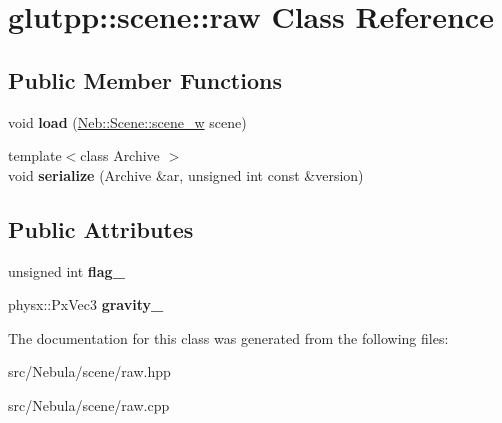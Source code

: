 \hypertarget{classglutpp_1_1scene_1_1raw}{\section{glutpp\-:\-:scene\-:\-:raw \-Class \-Reference}
\label{classglutpp_1_1scene_1_1raw}
}
\subsection*{\-Public \-Member \-Functions}
\begin{DoxyCompactItemize}
\item 
\hypertarget{classglutpp_1_1scene_1_1raw_a596009c3120c66eedb6ebdbb79a6ab8d}{void {\bfseries load} (\hyperlink{classNeb_1_1weak__ptr}{\-Neb\-::\-Scene\-::scene\-\_\-w} scene)}\label{classglutpp_1_1scene_1_1raw_a596009c3120c66eedb6ebdbb79a6ab8d}

\item 
\hypertarget{classglutpp_1_1scene_1_1raw_ae3066d954cd99a2551da179be7612af0}{{\footnotesize template$<$class Archive $>$ }\\void {\bfseries serialize} (\-Archive \&ar, unsigned int const \&version)}\label{classglutpp_1_1scene_1_1raw_ae3066d954cd99a2551da179be7612af0}

\end{DoxyCompactItemize}
\subsection*{\-Public \-Attributes}
\begin{DoxyCompactItemize}
\item 
\hypertarget{classglutpp_1_1scene_1_1raw_a7ea24c9872420ab621799bbb2d47c73d}{unsigned int {\bfseries flag\-\_\-}}\label{classglutpp_1_1scene_1_1raw_a7ea24c9872420ab621799bbb2d47c73d}

\item 
\hypertarget{classglutpp_1_1scene_1_1raw_a86841c5a5a09e63e0c3f6cff374db7de}{physx\-::\-Px\-Vec3 {\bfseries gravity\-\_\-}}\label{classglutpp_1_1scene_1_1raw_a86841c5a5a09e63e0c3f6cff374db7de}

\end{DoxyCompactItemize}


\-The documentation for this class was generated from the following files\-:\begin{DoxyCompactItemize}
\item 
src/\-Nebula/scene/raw.\-hpp\item 
src/\-Nebula/scene/raw.\-cpp\end{DoxyCompactItemize}
